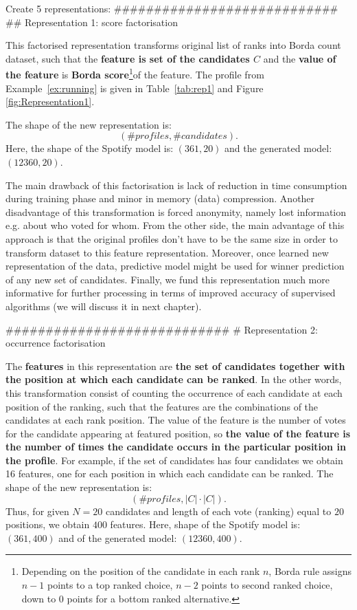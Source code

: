 Create 5 representations:
############################
## Representation 1: score factorisation

This factorised representation transforms original list of ranks into Borda count dataset, such that the \textbf{feature is set of the candidates $C$} and the \textbf{value of the feature} is \textbf{Borda score}\footnote{ Depending on the position of the candidate in each rank $n$, Borda rule assigns $n-1$ points to a top ranked choice, $n-2$ points to second ranked choice, down to $0$ points for a bottom ranked alternative.}of the feature. The profile from Example~\ref{ex:running} is given in Table~\ref{tab:rep1} and Figure~ \ref{fig:Representation1}.

The shape of the new representation is:$$(\# profiles, \# candidates).$$ Here, the shape of the Spotify model is: $(361, 20)$ and the generated model: $(12360, 20)$.

The main drawback of this factorisation is lack of reduction in time consumption during training phase and minor in memory (data) compression. Another disadvantage of this transformation  is forced anonymity, namely lost information e.g. about who voted for whom. From the other side, the main advantage of this approach is that the original profiles don’t have to be the same size in order to transform dataset to this feature representation. Moreover, once learned new representation of the data, predictive model might be used for winner prediction of any new set of candidates. 
Finally, we fund this representation much more informative for further processing in terms of improved accuracy of supervised algorithms (we will discuss it in next chapter).

############################
# Representation 2: occurrence factorisation

The \textbf{features} in this representation are \textbf{the set of candidates together with the position at which each candidate can be ranked}. In the other words, this transformation consist of counting the occurrence of each candidate at each position of the ranking, such that the features are the combinations of the candidates at each rank position. The value of the feature is the number of votes for the candidate appearing at featured position, so \textbf{the value of the feature is the number of times the candidate occurs in the particular position in the profile}. For example, if the set of candidates has four candidates we obtain 16 features, one for each position in which each candidate can be ranked.  The shape of the new representation is: $$( \# profiles, |C|\cdot|C|).$$ Thus, for given  $N = 20$  candidates  and length of each vote (ranking) equal to $20$ positions, we obtain $400$ features. Here, shape of the Spotify model is: $(361, 400)$ and of the generated model: $(12360, 400)$.

